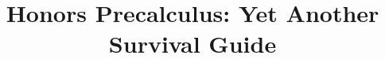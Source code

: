 \documentclass[11pt,twoside=semi,openright,numbers=noenddot]{scrbook}
\begin{document}
\title{Honors Precalculus: Yet Another Survival Guide}
\maketitle

\tableofcontents















\appendix{}


\end{document}
